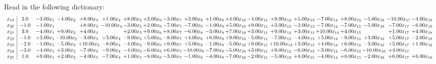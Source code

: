 \documentclass[9pt]{article}
\begin{document}
Read in the following dictionary:
\[\begin{array}{c| c c@{\hskip 2pt} c@{\hskip 2pt} c@{\hskip 2pt} c@{\hskip 2pt} c@{\hskip 2pt} c@{\hskip 2pt} c@{\hskip 2pt} c@{\hskip 2pt} c@{\hskip 2pt} c@{\hskip 2pt} c@{\hskip 2pt} c@{\hskip 2pt} c@{\hskip 2pt} c@{\hskip 2pt} c@{\hskip 2pt} c@{\hskip 2pt} c@{\hskip 2pt} c@{\hskip 2pt} }
 x_{19}   &  3.0 & -3.00 x_{1} & -4.00 x_{2} & +  8.00 x_{3} & +  1.00 x_{4} & +  8.00 x_{5} & +  3.00 x_{6} & -3.00 x_{7} & +  3.00 x_{8} & +  1.00 x_{9} & +  4.00 x_{10} & -4.00 x_{11} & +  9.00 x_{12} & +  5.00 x_{13} & -7.00 x_{14} & +  8.00 x_{15} & -5.00 x_{16} & -10.00 x_{17} & -4.00 x_{18}\\
 x_{20}   &  -1.0 & -1.00 x_{1} &   & +  8.00 x_{3} & -10.00 x_{4} & -3.00 x_{5} & +  2.00 x_{6} & -7.00 x_{7} & -7.00 x_{8} & -1.00 x_{9} & +  5.00 x_{10} & +  9.00 x_{11} & +  3.00 x_{12} & -2.00 x_{13} & -7.00 x_{14} & -7.00 x_{15} & -5.00 x_{16} & -7.00 x_{17} & -6.00 x_{18}\\
 x_{21}   &  3.0 & -4.00 x_{1} & +  9.00 x_{2} & +  4.00 x_{3} &   & +  2.00 x_{5} & +  9.00 x_{6} & +  8.00 x_{7} & -6.00 x_{8} & -3.00 x_{9} & +  7.00 x_{10} & +  3.00 x_{11} & +  9.00 x_{12} & +  3.00 x_{13} & + 10.00 x_{14} & +  4.00 x_{15} &   & +  1.00 x_{17} & +  4.00 x_{18}\\
 x_{22}   &  -1.0 & +  5.00 x_{1} & -10.00 x_{2} & -3.00 x_{3} & +  3.00 x_{4} & -9.00 x_{5} & +  5.00 x_{6} & -8.00 x_{7} & +  4.00 x_{8} & +  6.00 x_{9} & +  9.00 x_{10} & -5.00 x_{11} & -7.00 x_{12} & -4.00 x_{13} & +  5.00 x_{14} & -9.00 x_{15} & +  3.00 x_{16} & +  5.00 x_{17} & -2.00 x_{18}\\
 x_{23}   &  -2.0 & -1.00 x_{1} & -5.00 x_{2} & + 10.00 x_{3} & -8.00 x_{4} & -4.00 x_{5} & -9.00 x_{6} & +  9.00 x_{7} & +  5.00 x_{8} & -1.00 x_{9} & -5.00 x_{10} & +  9.00 x_{11} & + 10.00 x_{12} & +  3.00 x_{13} & +  4.00 x_{14} & +  6.00 x_{15} & -3.00 x_{16} & +  5.00 x_{17} & +  1.00 x_{18}\\
 x_{24}   &  -3.0 & -4.00 x_{1} & +  3.00 x_{2} & -7.00 x_{3} & -9.00 x_{4} & -4.00 x_{5} & -6.00 x_{6} & +  6.00 x_{7} & -10.00 x_{8} & -7.00 x_{9} & -5.00 x_{10} & +  3.00 x_{11} & +  9.00 x_{12} & -6.00 x_{13} & -3.00 x_{14} & -6.00 x_{15} & -10.00 x_{16} & +  4.00 x_{17} &   \\
 x_{25}   &  1.0 & +  9.00 x_{1} & +  2.00 x_{2} & -4.00 x_{3} & -7.00 x_{4} & +  1.00 x_{5} & -8.00 x_{6} & -3.00 x_{7} & -1.00 x_{8} & -4.00 x_{9} & -7.00 x_{10} & -2.00 x_{11} & -5.00 x_{12} & +  8.00 x_{13} & -4.00 x_{14} & +  8.00 x_{15} & -2.00 x_{16} & +  6.00 x_{17} & +  6.00 x_{18}\\

\end{array}\]
\end{document}
